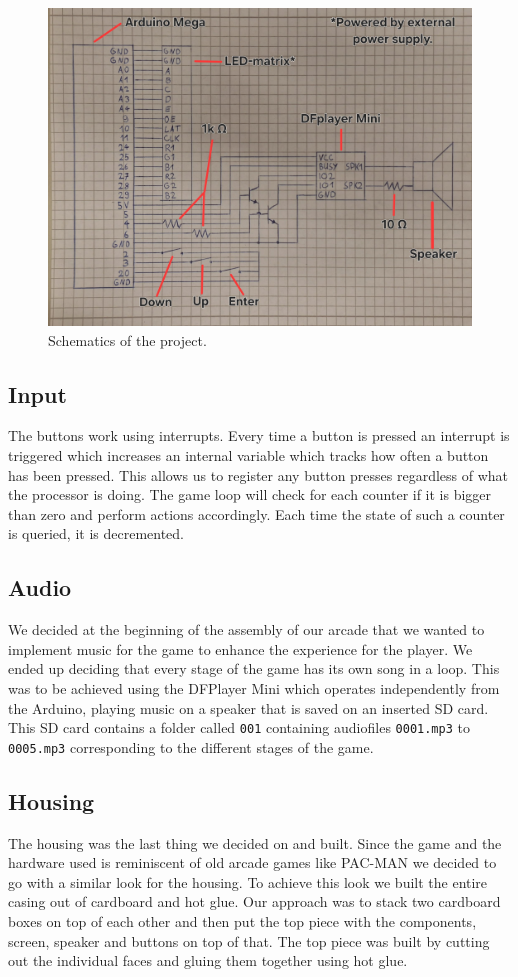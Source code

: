 \documentclass[10pt, a4paper]{article}
\begin{document}
\begin{figure}[h]
    \centering
    \includegraphics[width=0.9\linewidth]{schematics.jpg}
    \caption{Schematics of the project.}
\end{figure}

\subsection*{Input}
The buttons work using interrupts. Every time a button is pressed an interrupt is triggered which increases an internal variable which tracks how often a button has been pressed. This allows us to register any button presses regardless of what the processor is doing. The game loop will check for each counter if it is bigger than zero and perform actions accordingly. Each time the state of such a counter is queried, it is decremented.

\subsection*{Audio}
We decided at the beginning of the assembly of our arcade that we wanted to implement music for the game to enhance the experience for the player. We ended up deciding that every stage of the game has its own song in a loop. This was to be achieved using the DFPlayer Mini which operates independently from the Arduino, playing music on a speaker that is saved on an inserted SD card. This SD card contains a folder called \texttt{001} containing audiofiles \texttt{0001.mp3} to \texttt{0005.mp3} corresponding to the different stages of the game.

\subsection*{Housing}
The housing was the last thing we decided on and built. Since the game and the hardware used is reminiscent of old arcade games like PAC-MAN we decided to go with a similar look for the housing. To achieve this look we built the entire casing out of cardboard and hot glue. Our approach was to stack two cardboard boxes on top of each other and then put the top piece with the components, screen, speaker and buttons on top of that. The top piece was built by cutting out the individual faces and gluing them together using hot glue.
\end{document}
